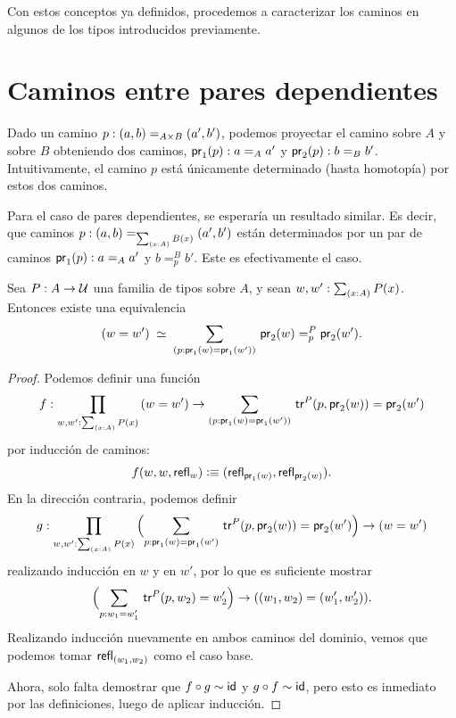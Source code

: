 \documentclass[../main.tex]{subfiles}
\begin{document}
Con estos conceptos ya definidos, procedemos a caracterizar los caminos en algunos de los tipos introducidos previamente.


\section{Caminos entre pares dependientes}
Dado un camino $p:\id[A\times B]{(a,b)}{(a',b')}$, podemos proyectar el camino sobre $A$ y sobre $B$ obteniendo dos caminos, $\ap{\proj1}p:\id[A]{a}{a'}$ y $\ap{\proj2}p:\id[B]{b}{b'}$.
Intuitivamente, el camino $p$ est\'a \'unicamente determinado (hasta homotop\'ia) por estos dos caminos.

Para el caso de pares dependientes, se esperar\'ia un resultado similar. Es decir, que caminos $p:\id[\sm{x:A}B(x)]{(a,b)}{(a',b')}$ est\'an determinados por un par de caminos $\fst(p):\id[A]{a}{a'}$ y $b=^B_p b'$.
Este es efectivamente el caso.

\begin{theorem}
  \label{sigma-char}
  Sea $P:A\to\type$ una familia de tipos sobre $A$, y sean $w,w':\sm{x:A}P(x)$. Entonces existe una equivalencia
  \begin{equation*}
    \eqvspaced{(w=w')}{\dsm{p:\proj{1}(w)=\proj{1}(w')} \snd(w)=^P_p\snd(w')}.
  \end{equation*}
\end{theorem}
\begin{proof}
  Podemos definir una función
  \begin{equation*}
    f : \prd{w,w':\sm{x:A}P(x)} (w=w') \to \dsm{p:\proj{1}(w)=\proj{1}(w')} \trfib{P}{p}{\proj{2}(w)}=\proj{2}(w')
  \end{equation*}
  por inducción de caminos:
  \begin{equation*}
    f(w,w,\refl{w})\defeq(\refl{\proj{1}(w)},\refl{\proj{2}(w)}).
  \end{equation*}
  En la direcci\'on contraria, podemos definir
  \begin{equation*}
    g : \prd{w,w':\sm{x:A}P(x)}
    \Parens{\sm{p:\proj{1}(w)=\proj{1}(w')}\trfib{P}{p}{\proj{2}(w)}=\proj{2}(w')}
    \to
    (w=w')
  \end{equation*}
  realizando inducci\'on en $w$ y en $w'$, por lo que es suficiente mostrar
  \begin{equation*}
    \Parens{\sm{p:w_1 = w_1'}\trfib{P}{p}{w_2}=w_2'} \to ((w_1,w_2)=(w_1',w_2')).
  \end{equation*}
  Realizando inducción nuevamente en ambos caminos del dominio, vemos que podemos tomar $\refl{(w_1,w_2)}$ como el caso base.

  Ahora, solo falta demostrar que $f \circ g \htpy \mathsf{id}$ y $g \circ f \htpy \mathsf{id}$, pero esto es inmediato por las definiciones, luego de aplicar inducción.
\end{proof}
\end{document}
